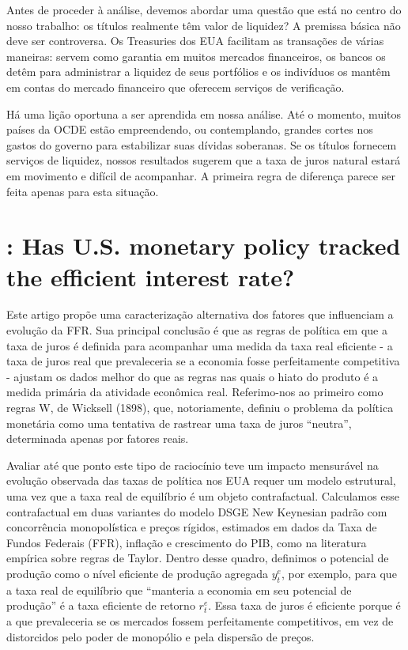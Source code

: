 Antes de proceder à análise, devemos abordar uma questão que está no centro do nosso trabalho: os títulos realmente têm valor de liquidez? A premissa básica não deve ser controversa. Os Treasuries dos EUA facilitam as transações de várias maneiras: servem como garantia em muitos mercados financeiros, os bancos os detêm para administrar a liquidez de seus portfólios e os indivíduos os mantêm em contas do mercado financeiro que oferecem serviços de verificação.

Há uma lição oportuna a ser aprendida em nossa análise. Até o momento, muitos países da OCDE estão empreendendo, ou contemplando, grandes cortes nos gastos do governo para estabilizar suas dívidas soberanas. Se os títulos fornecem serviços de liquidez, nossos resultados sugerem que a taxa de juros natural estará em movimento e difícil de acompanhar. A primeira regra de diferença parece ser feita apenas para esta situação.
%
%
\section{\citet{Curdia:2015}: Has U.S. monetary policy tracked the efficient interest rate? }

Este artigo propõe uma caracterização alternativa dos fatores que influenciam a evolução da FFR. Sua principal conclusão é que as regras de política em que a taxa de juros é definida para acompanhar uma medida da taxa real eficiente - a taxa de juros real que prevaleceria se a economia fosse perfeitamente competitiva - ajustam os dados melhor do que as regras nas quais o hiato do produto é a medida primária da atividade econômica real. Referimo-nos ao primeiro como regras W, de Wicksell (1898), que, notoriamente, definiu o problema da política monetária como uma tentativa de rastrear uma taxa de juros “neutra”, determinada apenas por fatores reais.

Avaliar até que ponto este tipo de raciocínio teve um impacto mensurável na evolução observada das taxas de política nos EUA requer um modelo estrutural, uma vez que a taxa real de equilíbrio é um objeto contrafactual. Calculamos esse contrafactual em duas variantes do modelo DSGE New Keynesian padrão com concorrência monopolística e preços rígidos, estimados em dados da Taxa de Fundos Federais (FFR), inflação e crescimento do PIB, como na literatura empírica sobre regras de Taylor. Dentro desse quadro, definimos o potencial de produção como o nível eficiente de produção agregada $y_t^{e}$, por exemplo, para que a taxa real de equilíbrio que “manteria a economia em seu potencial de produção” é a taxa eficiente de retorno $r_t^{e}$. Essa taxa de juros é eficiente porque é a que prevaleceria se os mercados fossem perfeitamente competitivos, em vez de distorcidos pelo poder de monopólio e pela dispersão de preços.

